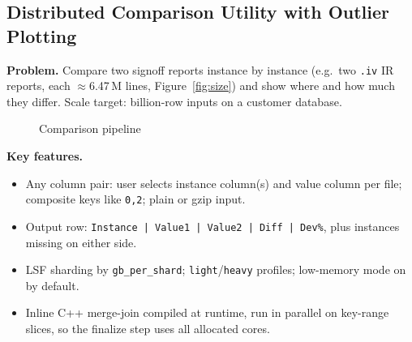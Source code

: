 \documentclass[11pt,a4paper]{article}
\newcommand{\fn}[1]{\texttt{#1}}                 %
\begin{document}
\subsection{Distributed Comparison Utility with Outlier Plotting}
\textbf{Problem.} Compare two signoff reports instance by instance (e.g.\ two \fn{.iv} IR
reports, each $\approx$6.47\,M lines, Figure~\ref{fig:size}) and show where and how much they
differ. Scale target: billion-row inputs on a customer database.

\begin{figure}[H]
\centering
{}
\caption{Comparison pipeline}
\end{figure}

\textbf{Key features.}
\begin{itemize}
  \item Any column pair: user selects instance column(s) and value column per file;
        composite keys like \fn{0,2}; plain or gzip input.
  \item Output row: \fn{Instance | Value1 | Value2 | Diff | Dev\%}, plus instances missing
        on either side.
  \item LSF sharding by \fn{gb\_per\_shard}; \fn{light}/\fn{heavy} profiles; low-memory mode
        on by default.
  \item Inline C++ merge-join compiled at runtime, run in parallel on key-range slices, so the
        finalize step uses all allocated cores.
\end{itemize}
\end{document}
